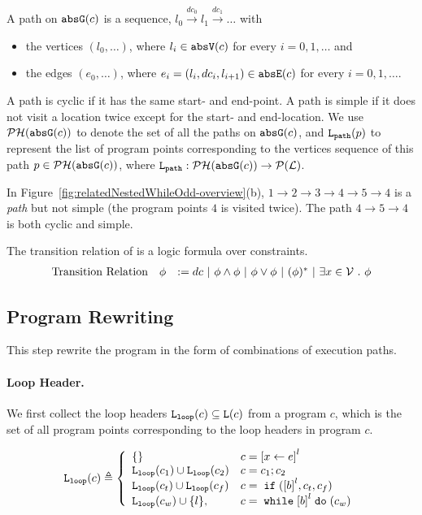 \begin{defn}[Path]
 \label{def:abs_cfgpath} 
 A path on $\mathtt{abs}{\mathtt{G}}(c)$ is a sequence, $ l_0 \xrightarrow{dc_0} l_1 \xrightarrow{dc_1} \ldots $ with
 \begin{itemize}
 \item the vertices $(l_0, \ldots)$, where $l_i \in \mathtt{abs}{\mathtt{V}}(c)$ for every $i = 0, 1, \ldots$ and
 \item the edges $(e_0, \ldots)$, where $e_i = (l_{i}, dc_i, l_{i + 1}) \in \mathtt{abs}{\mathtt{E}}(c)$ for every $i = 0, 1, \ldots$.
 \end{itemize}
 A path is cyclic if it has the same start- and end-point. A path is simple if it does not visit a location twice except for the start- and end-location. We use $\mathcal{PH}(\mathtt{abs}{\mathtt{G}}(c))$ to denote the set of all the paths on $\mathtt{abs}{\mathtt{G}}(c)$,
 and $\mathtt{L}_{\mathtt{path}}(p)$ to represent the list of program points corresponding to the vertices sequence of this path $p \in \mathcal{PH}(\mathtt{abs}{\mathtt{G}}(c))$,
 where $\mathtt{L}_{\mathtt{path}}: \mathcal{PH}(\mathtt{abs}{\mathtt{G}}(c)) \to \mathcal{P}{(\mathcal{L})}$.
 \end{defn}
 In Figure~\ref{fig:relatedNestedWhileOdd-overview}(b), $1 \to 2 \to 3 \to 4 \to 5 \to 4$ is a \emph{path} but not simple (the program points $4$ is visited twice). The path $4 \to 5 \to 4$ is both cyclic and simple.


 \begin{defn}
  The transition relation of is a logic formula over constraints.
  \[
    \begin{array}{rll}
     \mbox{Transition Relation} & \phi & := dc ~|~ \phi \land \phi ~|~ \phi \lor \phi ~|~ (\phi)^* ~|~ \exists x \in \mathcal{V} ~.~ \phi
    \end{array}
  \]
\end{defn}

\subsection{Program Rewriting}
This step rewrite the program in the form of combinations of execution paths.



\paragraph{Loop Header.}
We first collect the loop headers $\mathtt{L}_{\mathtt{loop}}(c) \subseteq \mathtt{L}(c)$ from a program $c$, which is the set of all program points corresponding to the loop headers in program $c$.
\begin{defn}
  \label{def:loopl}
  \[
  \loopl(c) \triangleq 
  \left\{
    \begin{array}{ll}
      \{\}  & {c} = \clabel{\assign x e}^{l} \\
      \loopl({c_1}) \cup \loopl({{c_2}})  & {c} = {c_1};{c_2} \\
      \loopl(c_t) \cup \loopl({{c_f}})   & {c} =\eif(\clabel{\bexpr}^{l}, c_t, c_f) \\
  \loopl(c_w) \cup \{l\}, &  {c}   = \ewhile \clabel{\bexpr}^{l} \edo (c_w)
  \end{array}
\right.
\]
  \end{defn}

